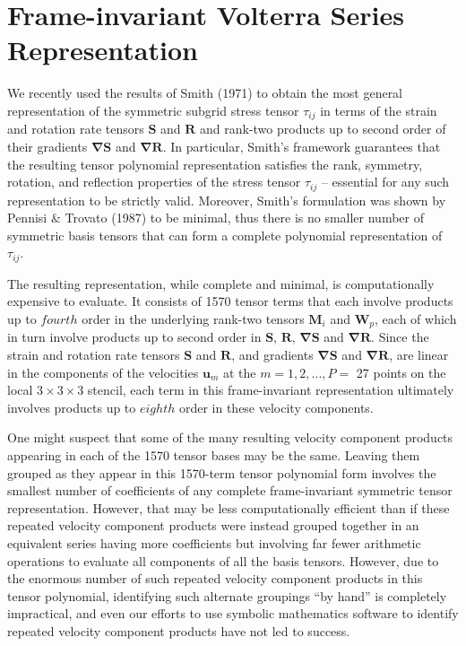 \graphicspath{ {./Ch8/}  } 

\chapter{Frame-invariant Volterra Series Representation }

We recently used the results of Smith (1971) to obtain the most general representation of the symmetric subgrid stress tensor  $\tau_{ij}$ in terms of the strain and rotation rate tensors $\mathbf{S}$ and $\mathbf{R}$ and rank-two products up to second order of their gradients  $\mathbf{\nabla S}$  and $\mathbf{\nabla R}$. In particular, Smith’s framework guarantees that the resulting tensor polynomial representation satisfies the rank, symmetry, rotation, and reflection properties of the stress tensor $\tau_{ij}$ -- essential for any such representation to be strictly valid.  Moreover, Smith’s formulation was shown by Pennisi $\&$ Trovato (1987) to be minimal, thus there is no smaller number of symmetric basis tensors that can form a complete polynomial representation of $\tau_{ij}$.  

The resulting representation, while complete and minimal, is computationally expensive to evaluate.  It consists of 1570 tensor terms that each involve products up to $fourth$ order in the underlying rank-two tensors $\mathbf{M}_i$ and $\mathbf{W}_p$, each of which in turn involve products up to second order in $\mathbf{S}$, $\mathbf{R}$, $\mathbf{\nabla S}$  and $\mathbf{\nabla R}$.  Since the strain and rotation rate tensors  $\mathbf{S}$ and  $\mathbf{R}$, and gradients $\mathbf{\nabla S}$  and $\mathbf{\nabla R}$, are linear in the components of the velocities  $\mathbf{u}_{m}$ at the $m = 1, 2,..., P =$ 27 points on the local $3 \times 3 \times 3$  stencil, each term in this frame-invariant representation ultimately involves products up to $eighth$ order in these velocity components.  

One might suspect that some of the many resulting velocity component products appearing in each of the 1570 tensor bases may be the same. Leaving them grouped as they appear in this 1570-term tensor polynomial form involves the smallest number of coefficients of any complete frame-invariant symmetric tensor representation. However, that may be less computationally efficient than if these repeated velocity component products were instead grouped together in an equivalent series having more coefficients but involving far fewer arithmetic operations to evaluate all components of all the basis tensors. However, due to the enormous number of such repeated velocity component products in this tensor polynomial, identifying such alternate groupings “by hand” is completely impractical, and even our efforts to use symbolic mathematics software to identify repeated velocity component products have not led to success.


